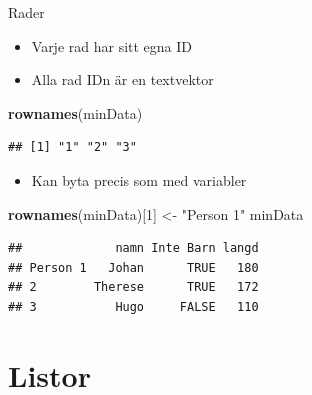 \documentclass[
  11pt,
  ignorenonframetext,
]{beamer}
\newenvironment{Shaded}{\begin{snugshade}}{\end{snugshade}}
\newcommand{\DecValTok}[1]{\textcolor[rgb]{0.00,0.00,0.81}{#1}}
\newcommand{\KeywordTok}[1]{\textcolor[rgb]{0.13,0.29,0.53}{\textbf{#1}}}
\newcommand{\NormalTok}[1]{#1}
\newcommand{\StringTok}[1]{\textcolor[rgb]{0.31,0.60,0.02}{#1}}
\providecommand{\tightlist}{%
  \setlength{\itemsep}{0pt}\setlength{\parskip}{0pt}}
\begin{document}
\begin{frame}[fragile]{Rader}
\protect\hypertarget{rader}{}
\begin{itemize}
\tightlist
\item
  Varje rad har sitt egna ID
\item
  Alla rad IDn är en textvektor
\end{itemize}

\begin{Shaded}
\begin{Highlighting}[]
\KeywordTok{rownames}\NormalTok{(minData)}
\end{Highlighting}
\end{Shaded}

\begin{verbatim}
## [1] "1" "2" "3"
\end{verbatim}

\pause

\begin{itemize}
\tightlist
\item
  Kan byta precis som med variabler
\end{itemize}

\begin{Shaded}
\begin{Highlighting}[]
\KeywordTok{rownames}\NormalTok{(minData)[}\DecValTok{1}\NormalTok{] \textless{}{-}}\StringTok{ "Person 1"}
\NormalTok{minData}
\end{Highlighting}
\end{Shaded}

\begin{verbatim}
##             namn Inte Barn langd
## Person 1   Johan      TRUE   180
## 2        Therese      TRUE   172
## 3           Hugo     FALSE   110
\end{verbatim}
\end{frame}

\hypertarget{listor}{%
\section{Listor}\label{listor}}
\end{document}
